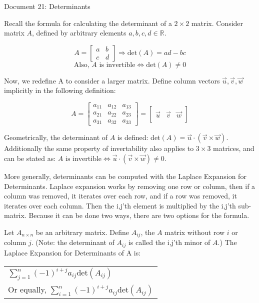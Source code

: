 \documentclass[11pt]{article}
\begin{document}
\begin{center}
Document 21: Determinants
\end{center}

\vspace{0.25cm}
Recall the formula for calculating the determinant of a $2\times 2$ matrix. Consider matrix $A$, defined by arbitrary elements $a,b,c,d\in\mathbb{R}$.

$$A=\begin{bmatrix}a & b\\ c & d\end{bmatrix}\Rightarrow \text{det}(A)=ad-bc$$
$$\text{Also, }A\text{ is invertible}\Leftrightarrow \text{det}(A)\neq 0$$

Now, we redefine A to consider a larger matrix. Define column vectors $\vec{u},\vec{v},\vec{w}$ implicitly in the following definition:

$$A=\begin{bmatrix}a_{11} & a_{12} & a_{13}\\a_{21} & a_{22} & a_{23}\\a_{31} & a_{32} & a_{33}\end{bmatrix}=\begin{bmatrix} & & \\\vec{u} & \vec{v} & \vec{w}\\ & & \end{bmatrix}$$

Geometrically, the determinant of $A$ is defined: det$(A)=\vec{u}\cdot(\vec{v}\times\vec{w})$. Additionally the same property of invertability also applies to $3\times 3$ matrices, and can be stated as: $A\text{ is invertible}\Leftrightarrow \vec{u}\cdot(\vec{v}\times\vec{w})\neq 0$.

More generally, determinants can be computed with the Laplace Expansion for Determinants. Laplace expansion works by removing one row or column, then if a column was removed, it iterates over each row, and if a row was removed, it iterates over each column. Then the i,j'th element is multiplied by the i,j'th sub-matrix. Because it can be done two ways, there are two options for the formula.

Let $A_{n\times n}$ be an arbitrary matrix. Define $A_{ij}$, the $A$ matrix without row $i$ or column $j$. (Note: the determinant of $A_{ij}$ is called the i,j'th minor of $A$.) The Laplace Expansion for Determinants of A is:

\begin{center}\begin{tabular}{l}
$\sum_{j=1}^n{(-1)^{i+j}a_{ij}\text{det}(A_{ij})}$\vspace{0.1cm}\\
Or equally, $\sum_{i=1}^n{(-1)^{i+j}a_{ij}\text{det}(A_{ij})}$
\end{tabular}\end{center}
\end{document}

